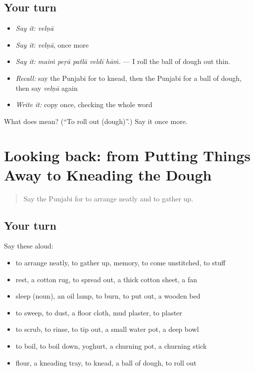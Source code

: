 \subsection*{Your turn}
\begin{itemize}
\raggedright
  \item \emph{Say it:} \emph{velṇā}
  \item \emph{Say it:} \emph{velṇā}, once more
  \item \emph{Say it:} \emph{maiṁ peṛā patlā veldī hāṁ.} — I roll the ball of dough out thin.
  \item \emph{Recall:} say the Punjabi for to knead, then the Punjabi for a ball of dough, then say \emph{velṇā} again
  \item \emph{Write it:} copy \textbf{} once, checking the whole word
\end{itemize}

\begin{tcolorbox}[breakable,colback=teal!4,colframe=teal!35!black,title={Before you move on}]
What does  mean? (\textquotedblleft{}To roll out (dough)\textquotedblright{}.) Say it once more.
\end{tcolorbox}
\section[(dialogue)]{Looking back: from Putting Things Away to Kneading the Dough}

\label{lesson:PA-R238-review-232-238}



\begin{quote}
Say the Punjabi for to arrange neatly and to gather up.
\end{quote}

\subsection*{Your turn}
Say these aloud:

\begin{itemize}
\raggedright
  \item to arrange neatly, to gather up, memory, to come unstitched, to stuff
  \item rest, a cotton rug, to spread out, a thick cotton sheet, a fan
  \item sleep (noun), an oil lamp, to burn, to put out, a wooden bed
  \item to sweep, to dust, a floor cloth, mud plaster, to plaster
  \item to scrub, to rinse, to tip out, a small water pot, a deep bowl
  \item to boil, to boil down, yoghurt, a churning pot, a churning stick
  \item flour, a kneading tray, to knead, a ball of dough, to roll out
\end{itemize}

